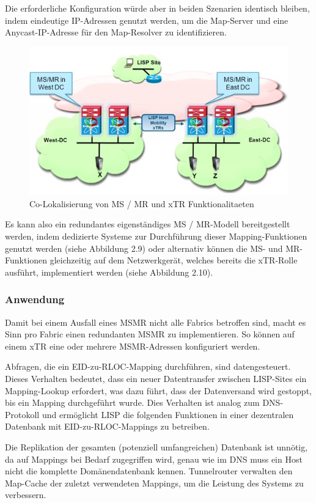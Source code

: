 Die erforderliche Konfiguration würde aber in beiden Szenarien identisch bleiben, indem eindeutige IP-Adressen genutzt werden, um die Map-Server und eine Anycast-IP-Adresse für den Map-Resolver zu identifizieren.

\begin{figure}[H]
	\centering
	\includegraphics[width=0.8\linewidth]{img/Absicherung/LISP-Example2}
	\caption{Co-Lokalisierung von MS / MR und xTR Funktionalitaeten \cite{LISP-mobility} }
	\label{fig:Co-Lokalisierung von MS / MR und xTR Funktionalitaeten}
\end{figure}

Es kann also ein redundantes eigenständiges MS / MR-Modell bereitgestellt werden, indem dedizierte Systeme zur Durchführung dieser Mapping-Funktionen genutzt werden (siehe Abbildung 2.9) oder alternativ können die MS- und MR-Funktionen gleichzeitig auf dem Netzwerkgerät, welches bereits die xTR-Rolle ausführt, implementiert werden (siehe Abbildung 2.10).

\subsubsection{Anwendung}
Damit bei einem Ausfall eines MSMR nicht alle Fabrics betroffen sind, macht es Sinn pro Fabric einen redundanten MSMR zu implementieren. So können auf einem xTR eine oder mehrere MSMR-Adressen konfiguriert werden.

Abfragen, die ein EID-zu-RLOC-Mapping durchführen, sind datengesteuert. Dieses Verhalten bedeutet, dass ein neuer Datentransfer zwischen LISP-Sites ein Mapping-Lookup erfordert, was dazu führt, dass der Datenversand wird gestoppt, bis ein Mapping durchgeführt wurde. Dies Verhalten ist analog zum DNS-Protokoll und ermöglicht LISP die folgenden Funktionen in einer dezentralen Datenbank mit EID-zu-RLOC-Mappings zu betreiben. 

Die Replikation der gesamten (potenziell umfangreichen) Datenbank ist unnötig, da auf Mappings bei Bedarf zugegriffen wird, genau wie im DNS muss ein Host nicht die komplette Domänendatenbank kennen. Tunnelrouter verwalten den Map-Cache der zuletzt verwendeten Mappings, um die Leistung des Systems zu verbessern.

